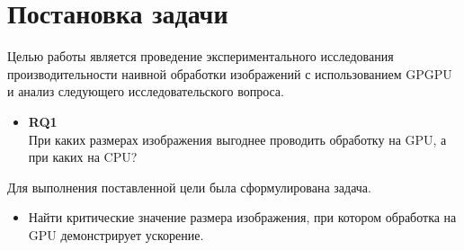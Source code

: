 
\section{Постановка задачи}
\label{sec:task}
\noindent Целью работы является проведение экспериментального исследования производительности наивной обработки изображений с использованием GPGPU и анализ следующего исследовательского вопроса.

\begin{itemize}
    \item{\textbf{RQ1}\label{rq1}} \\
    При каких размерах изображения выгоднее проводить обработку на GPU, а при каких на CPU?
\end{itemize}

\noindent Для выполнения поставленной цели была сформулирована задача.
 \begin{itemize}
 	\item Найти критические значение размера изображения, при котором обработка на GPU демонстрирует ускорение.
 \end{itemize}
